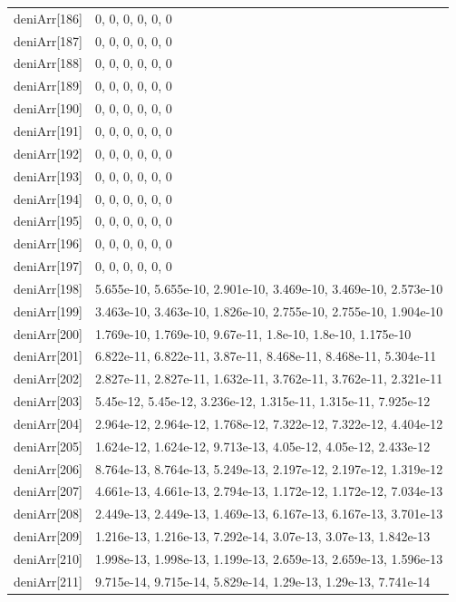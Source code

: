 {\begin{longtable}{p{}p{}}
{}deniArr[186] & 0, 0, 0, 0, 0, 0\\
{}deniArr[187] & 0, 0, 0, 0, 0, 0\\
{}deniArr[188] & 0, 0, 0, 0, 0, 0\\
{}deniArr[189] & 0, 0, 0, 0, 0, 0\\
{}deniArr[190] & 0, 0, 0, 0, 0, 0\\
{}deniArr[191] & 0, 0, 0, 0, 0, 0\\
{}deniArr[192] & 0, 0, 0, 0, 0, 0\\
{}deniArr[193] & 0, 0, 0, 0, 0, 0\\
{}deniArr[194] & 0, 0, 0, 0, 0, 0\\
{}deniArr[195] & 0, 0, 0, 0, 0, 0\\
{}deniArr[196] & 0, 0, 0, 0, 0, 0\\
{}deniArr[197] & 0, 0, 0, 0, 0, 0\\
{}deniArr[198] & 5.655e-10, 5.655e-10, 2.901e-10, 3.469e-10, 3.469e-10, 2.573e-10\\
{}deniArr[199] & 3.463e-10, 3.463e-10, 1.826e-10, 2.755e-10, 2.755e-10, 1.904e-10\\
{}deniArr[200] & 1.769e-10, 1.769e-10, 9.67e-11, 1.8e-10, 1.8e-10, 1.175e-10\\
{}deniArr[201] & 6.822e-11, 6.822e-11, 3.87e-11, 8.468e-11, 8.468e-11, 5.304e-11\\
{}deniArr[202] & 2.827e-11, 2.827e-11, 1.632e-11, 3.762e-11, 3.762e-11, 2.321e-11\\
{}deniArr[203] & 5.45e-12, 5.45e-12, 3.236e-12, 1.315e-11, 1.315e-11, 7.925e-12\\
{}deniArr[204] & 2.964e-12, 2.964e-12, 1.768e-12, 7.322e-12, 7.322e-12, 4.404e-12\\
{}deniArr[205] & 1.624e-12, 1.624e-12, 9.713e-13, 4.05e-12, 4.05e-12, 2.433e-12\\
{}deniArr[206] & 8.764e-13, 8.764e-13, 5.249e-13, 2.197e-12, 2.197e-12, 1.319e-12\\
{}deniArr[207] & 4.661e-13, 4.661e-13, 2.794e-13, 1.172e-12, 1.172e-12, 7.034e-13\\
{}deniArr[208] & 2.449e-13, 2.449e-13, 1.469e-13, 6.167e-13, 6.167e-13, 3.701e-13\\
{}deniArr[209] & 1.216e-13, 1.216e-13, 7.292e-14, 3.07e-13, 3.07e-13, 1.842e-13\\
{}deniArr[210] & 1.998e-13, 1.998e-13, 1.199e-13, 2.659e-13, 2.659e-13, 1.596e-13\\
{}deniArr[211] & 9.715e-14, 9.715e-14, 5.829e-14, 1.29e-13, 1.29e-13, 7.741e-14\\

\end{longtable}}
